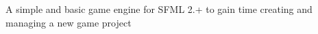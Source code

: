 A simple and basic game engine for S\+F\+ML 2.+ to gain time creating and managing a new game project 